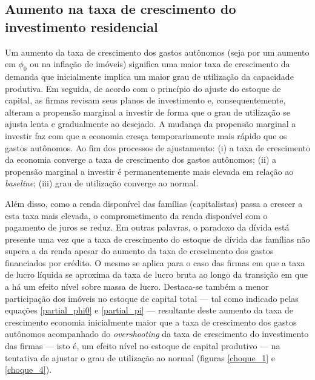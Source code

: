 \subsection*{Aumento na taxa de crescimento do investimento residencial}


Um aumento da taxa de crescimento dos gastos autônomos (seja por um aumento em $\phi_0$ ou na inflação de imóveis) significa uma maior taxa de crescimento da demanda que inicialmente implica um maior grau de utilização da capacidade produtiva. Em seguida, de acordo com o princípio do ajuste do estoque de capital, as firmas revisam seus planos de investimento e, consequentemente, alteram a propensão marginal a investir de forma que o grau de utilização se ajusta lenta e gradualmente ao desejado. A mudança da propensão marginal a investir faz com que  a economia cresça temporariamente mais rápido que os gastos autônomos. Ao fim dos processos de ajustamento: (i) a taxa de crescimento da economia converge a taxa de crescimento dos gastos autônomos; (ii) a propensão marginal a investir é permanentemente mais elevada em relação ao \textit{baseline}; (iii) grau de utilização converge ao normal.


Além disso, como a renda disponível das famílias (capitalistas) passa a crescer a esta taxa mais elevada, o comprometimento da renda disponível com o pagamento de juros se reduz. 
Em outras palavras, o paradoxo da dívida está presente 
uma vez que a taxa de crescimento do estoque de dívida das famílias não supera a da renda apesar do aumento da taxa de crescimento dos gastos financiados por crédito. O mesmo se aplica para o caso das firmas em que a taxa de lucro líquida se aproxima da taxa de lucro bruta ao longo da transição em que a há um efeito nível sobre massa de lucro. 
Destaca-se também a menor participação dos imóveis no estoque de capital total --- tal como indicado pelas equações \ref{partial_phi0} e \ref{partial_pi} --- resultante deste aumento da taxa de crescimento economia inicialmente maior que a taxa de crescimento dos gastos autônomos acompanhado do \textit{overshooting} da taxa de crescimento do investimento das firmas --- isto é, um efeito nível no estoque de capital produtivo --- na tentativa de ajustar o grau de utilização ao normal (figuras \ref{choque_1} e \ref{choque_4}).


